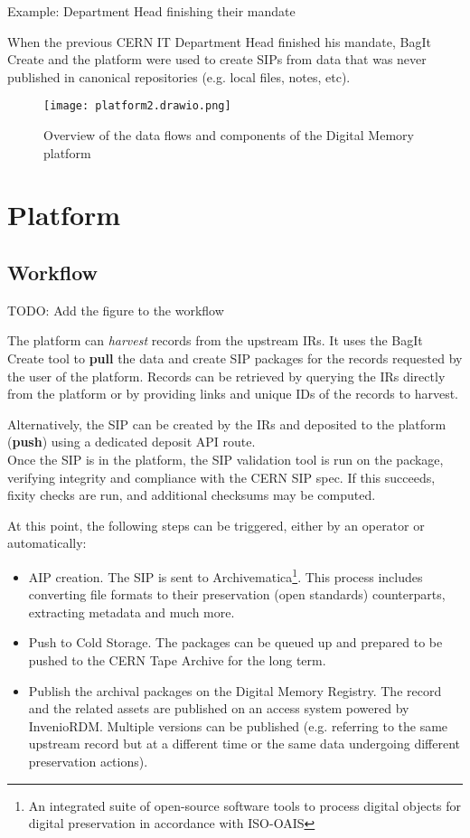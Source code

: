 \documentclass[11pt]{IEEEtran}
\begin{document}
\par{Example: Department Head finishing their mandate}

When the previous CERN IT Department Head finished his mandate, BagIt Create and the platform were used to create SIPs from data that was never published in canonical repositories (e.g. local files, notes, etc).

\begin{figure*}
    \texttt{[image: platform2.drawio.png]}
    \caption{Overview of the data flows and components of the Digital Memory platform}
\end{figure*}



\section{Platform}

\subsection{Workflow}

TODO: Add the figure to the workflow

The platform can \textit{harvest} records from the upstream IRs. It uses the BagIt Create tool to \textbf{pull} the data and create SIP packages for the records requested by the user of the platform. Records can be retrieved by querying the IRs directly from the platform or by providing links and unique IDs of the records to harvest.

Alternatively, the SIP can be created by the IRs and deposited to the platform (\textbf{push}) using a dedicated deposit API route.
\\

Once the SIP is in the platform, the SIP validation tool is run on the package, verifying integrity and compliance with the CERN SIP spec. If this succeeds, fixity checks are run, and additional checksums may be computed.

At this point, the following steps can be triggered, either by an operator or automatically:

\begin{itemize}
    \item AIP creation. The SIP is sent to Archivematica\footnote{An integrated suite\cite{Archivematica} of open-source software tools to process digital objects for digital preservation in accordance with ISO-OAIS}. This process includes converting file formats to their preservation (open standards) counterparts, extracting metadata and much more.
    \item Push to Cold Storage. The packages can be queued up and prepared to be pushed to the CERN Tape Archive for the long term.
    \item Publish the archival packages on the Digital Memory Registry. The record and the related assets are published on an access system powered by InvenioRDM. Multiple versions can be published (e.g. referring to the same upstream record but at a different time or the same data undergoing different preservation actions).
\end{itemize}
\end{document}
